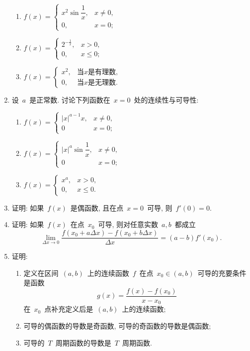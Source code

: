 \documentclass[UTF8,a4paper,20pt]{article}
\begin{document}
\begin{enumerate}[1.]
\begin{enumerate}[(1)]
	\item $f(x)=\begin{cases} x^2\sin{\dfrac{1}{x}}, &x\neq 0, \\ 0, &x=0;\end{cases}$
	\item $f(x)=\begin{cases} 2^{-\frac{1}{x}}, &x>0,\\ 0, &x\leqslant 0;\end{cases}$
	\item $f(x)=\begin{cases} x^2, &\text{当$x$是有理数}, \\ 0, &\text{当$x$是无理数}. \end{cases}$
	\end{enumerate}

\item 设~$a$~是正常数. 讨论下列函数在~$x=0$~处的连续性与可导性: 
	\begin{enumerate}[(1)]
	\item $f(x)=\begin{cases} |x|^{a-1}x, &x\neq 0,\\ 0 &x=0;\end{cases}$
	\item $f(x)=\begin{cases} |x|^a\sin{\dfrac{1}{x}}, &x\neq 0,\\ 0 &x=0;\end{cases}$
	\item $f(x)=\begin{cases} x^a, &x>0,\\0, &x\leqslant 0.\end{cases}$
	\end{enumerate}

\item 证明: 如果~$f(x)$~是偶函数, 且在点~$x=0$~可导, 则~$f'(0)=0$.

\item 证明: 如果~$f(x)$~在点~$x_0$~可导, 则对任意实数~$a,b$~都成立
\[ \lim\limits_{\Delta x\to 0} \dfrac{f(x_0+a\Delta x)-f(x_0+b\Delta x)}{\Delta x}=(a-b)f'(x_0).\]

\item 证明:
	\begin{enumerate}[(1)]
	\item 定义在区间~$(a,b)$~上的连续函数~$f$~在点~$x_0\in(a,b)$~可导的充要条件是函数
\[g(x)=\dfrac{f(x)-f(x_0)}{x-x_0}\]
在~$x_0$~点补充定义后是~$(a,b)$~上的连续函数;
	\item 可导的偶函数的导数是奇函数, 可导的奇函数的导数是偶函数;
	\item 可导的~$T$~周期函数的导数是~$T$~周期函数.
	\end{enumerate}


\end{enumerate}
\end{document}
